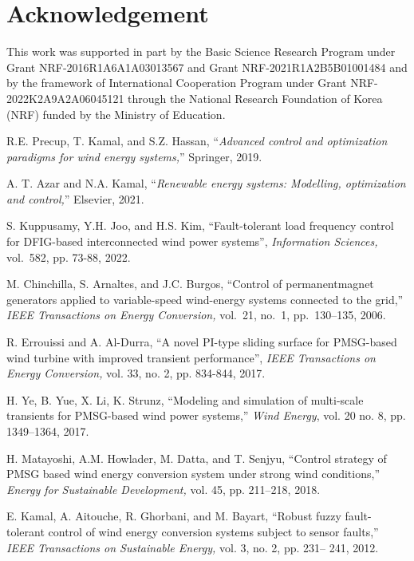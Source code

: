 \documentclass[preprint,11pt]{elsarticle}
\begin{document}
\vspace{-0.5cm}
\section*{Acknowledgement}\vspace{-0.2cm}
This work was supported in part by the Basic Science Research Program under Grant NRF-2016R1A6A1A03013567 and Grant NRF-2021R1A2B5B01001484 and by the framework of International Cooperation Program under Grant NRF-2022K2A9A2A06045121 through the National Research Foundation of Korea (NRF) funded by the Ministry of Education.
\vspace{-0.5cm}
\begin{thebibliography}{00}\frenchspacing
\balance
{}
R.E. Precup, T. Kamal, and S.Z. Hassan, ``{\em Advanced control and optimization paradigms for wind energy systems,}'' Springer, 2019.

A. T. Azar and N.A. Kamal, ``{\em Renewable energy systems: Modelling, optimization and control,}'' Elsevier, 2021.

S. Kuppusamy, Y.H. Joo, and H.S. Kim, ``Fault-tolerant load frequency control for DFIG-based interconnected wind power systems'',  {\em Information Sciences,} vol.~582, pp. 73-88, 2022.

M. Chinchilla, S. Arnaltes, and J.C. Burgos, ``Control of permanentmagnet generators applied to variable-speed wind-energy systems connected to the grid,'' {\em IEEE Transactions on Energy Conversion,} vol.~21, no.~1, pp.~130–135, 2006.

R. Errouissi and A. Al-Durra, ``A novel PI-type sliding surface for PMSG-based wind turbine with improved transient performance'', {\em IEEE Transactions on Energy Conversion,} vol. 33, no. 2, pp. 834-844, 2017.

H. Ye, B. Yue, X. Li, K. Strunz, ``Modeling and simulation of multi-scale transients for PMSG-based wind power systems,'' {\em Wind Energy}, vol. 20 no. 8, pp. 1349–1364, 2017.

H. Matayoshi, A.M. Howlader, M. Datta, and T. Senjyu, ``Control strategy of PMSG based wind energy conversion system under strong wind conditions,''  {\em Energy for Sustainable Development,} vol. 45, pp. 211–218, 2018.

E. Kamal, A. Aitouche, R. Ghorbani, and M. Bayart, ``Robust fuzzy fault-tolerant control of wind energy conversion systems subject to sensor faults,'' {\em IEEE Transactions on Sustainable Energy,} vol. 3, no. 2, pp. 231– 241, 2012.


\end{thebibliography}
\end{document}

